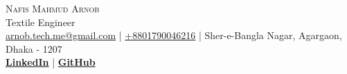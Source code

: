 
\begin{center}

    {\Huge \scshape {Nafis Mahmud Arnob}}\\
    \vspace{2mm}
     {\large Textile Engineer} \\
    \vspace{2mm}
    \href{mailto:arnob.tech.me@gmail.com}{arnob.tech.me@gmail.com} | \href{tel:+8801790046216}{+8801790046216} | Sher-e-Bangla Nagar, Agargaon, Dhaka - 1207\\
    \vspace{1mm}
    \textbf{\href{https://www.linkedin.com/in/arnob-mahmud/}{LinkedIn}} | \textbf{\href{https://www.github.com/ArnobMahmud}{GitHub}}\\

  \end{center}
